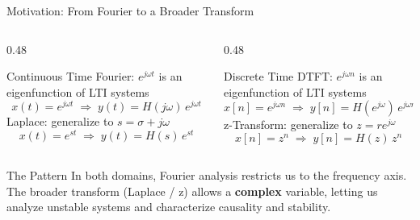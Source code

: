\begin{frame}{Motivation: From Fourier to a Broader Transform}
  \small
  \begin{columns}[T]
    \begin{column}{0.48\textwidth}
      \begin{conceptbox}{Continuous Time}
        Fourier: $e^{j\omega t}$ is an eigenfunction of LTI systems
        \[
          x(t) = e^{j\omega t}
          \;\Longrightarrow\;
          y(t) = H(j\omega)\,e^{j\omega t}
        \]
        \tcblower
        Laplace: generalize to $s = \sigma + j\omega$
        \[
          x(t) = e^{st}
          \;\Longrightarrow\;
          y(t) = H(s)\,e^{st}
        \]
      \end{conceptbox}
    \end{column}
    \begin{column}{0.48\textwidth}
      \begin{conceptbox}{Discrete Time}
        DTFT: $e^{j\omega n}$ is an eigenfunction of LTI systems
        \[
          x[n] = e^{j\omega n}
          \;\Longrightarrow\;
          y[n] = H(e^{j\omega})\,e^{j\omega n}
        \]
        \tcblower
        z-Transform: generalize to $z = re^{j\omega}$
        \[
          x[n] = z^{n}
          \;\Longrightarrow\;
          y[n] = H(z)\,z^{n}
        \]
      \end{conceptbox}
    \end{column}
  \end{columns}
  \vspace{0.3cm}
  \begin{insightbox}{The Pattern}
    \footnotesize
    In both domains, Fourier analysis restricts us to the frequency axis.
    The broader transform (Laplace / z) allows a \textbf{complex} variable,
    letting us analyze unstable systems and characterize causality and stability.
  \end{insightbox}
\end{frame}

